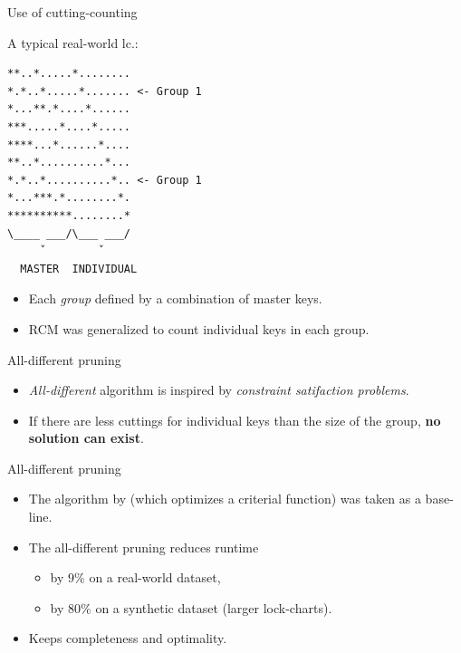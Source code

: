 \begin{frame}[fragile]{Use of cutting-counting}
  \begin{minipage}[t][180pt][t]{.58\textwidth}
    A typical real-world lc.:
    \begin{verbatim}
**..*.....*........
*.*..*.....*....... <- Group 1
*...**.*....*......
***.....*....*.....
****...*......*....
**..*..........*...
*.*..*..........*.. <- Group 1
*...***.*........*.
**********........*
\____ ___/\___ ___/
     ˇ        ˇ
  MASTER  INDIVIDUAL
    \end{verbatim}
  \end{minipage}
  \pause
  \hfill
  \begin{minipage}[t][180pt][t]{.4\textwidth}
    \begin{itemize}
      \item Each \textit{group} defined by a combination of master keys.
      \item RCM was generalized to count individual keys in each group.
    \end{itemize}
  \end{minipage}
\end{frame}



\begin{frame}{All-different pruning}
  \begin{itemize}
    \item \emph{All-different} algorithm is inspired
    by \emph{constraint satifaction problems}.

    \item If there are less cuttings for individual keys
    than the size of the group, \textbf{no solution can exist}.
  \end{itemize}
\end{frame}


\begin{frame}{All-different pruning}
  \begin{itemize}
    \item The algorithm by \cite{lawer2004}
    (which optimizes a criterial function)
    was taken as a base-line.
    \item The all-different pruning reduces runtime
    \begin{itemize}
      \item by $9\%$ on a real-world dataset,
      \item by $80\%$ on a synthetic dataset (larger lock-charts).
    \end{itemize}
    \item Keeps completeness and optimality.
  \end{itemize}
\end{frame}

